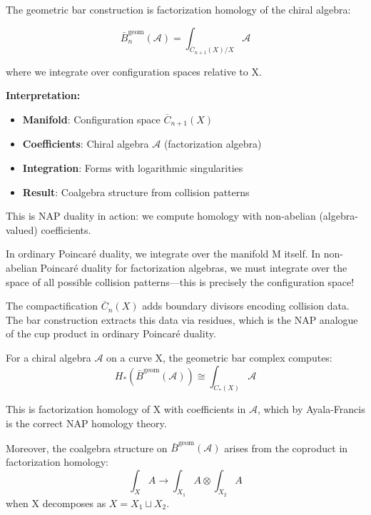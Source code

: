 \begin{framework}\label{framework:bar-fh}
The geometric bar construction is factorization homology of the chiral algebra:

$$\bar{B}^{\text{geom}}_n(\mathcal{A}) = \int_{\overline{C}_{n+1}(X)/X} \mathcal{A}$$

where we integrate over configuration spaces relative to X.

\textbf{Interpretation:}
\begin{itemize}
\item \textbf{Manifold}: Configuration space $\overline{C}_{n+1}(X)$
\item \textbf{Coefficients}: Chiral algebra $\mathcal{A}$ (factorization algebra)
\item \textbf{Integration}: Forms with logarithmic singularities
\item \textbf{Result}: Coalgebra structure from collision patterns
\end{itemize}

This is NAP duality in action: we compute homology with non-abelian (algebra-valued) coefficients.
\end{framework}

\begin{remark}\label{rem:why-config-NAP}
In ordinary Poincaré duality, we integrate over the manifold M itself. In non-abelian Poincaré duality for factorization algebras, we must integrate over the space of all possible collision patterns—this is precisely the configuration space!

The compactification $\overline{C}_n(X)$ adds boundary divisors encoding collision data. The bar construction extracts this data via residues, which is the NAP analogue of the cup product in ordinary Poincaré duality.
\end{remark}

\begin{theorem}\label{thm:bar-NAP-homology}
For a chiral algebra $\mathcal{A}$ on a curve X, the geometric bar complex computes:
$$H_*(\bar{B}^{\text{geom}}(\mathcal{A})) \cong \int_{C_*(X)} \mathcal{A}$$

This is factorization homology of X with coefficients in $\mathcal{A}$, which by Ayala-Francis is the correct NAP homology theory.

Moreover, the coalgebra structure on $\bar{B}^{\text{geom}}(\mathcal{A})$ arises from the coproduct in factorization homology:
$$\int_X A \to \int_{X_1} A \otimes \int_{X_2} A$$
when X decomposes as $X = X_1 \sqcup X_2$.
\end{theorem}

